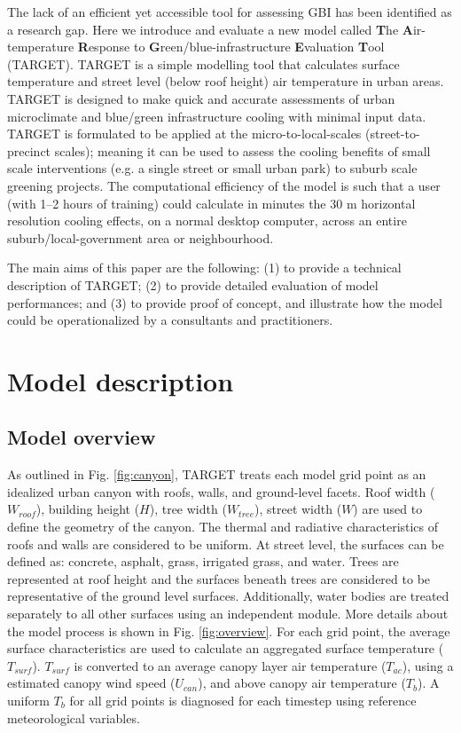 \documentclass[gmd, manuscript]{copernicus}
\begin{document}
The lack of an efficient yet accessible tool for assessing GBI has been identified as a research gap. Here we introduce and evaluate a new model called \textbf{T}he \textbf{A}ir-temperature \textbf{R}esponse to \textbf{G}reen/blue-infrastructure \textbf{E}valuation \textbf{T}ool (TARGET). TARGET is a simple modelling tool that calculates surface temperature and street level (below roof height) air temperature in urban areas. TARGET is designed to make quick and accurate assessments of urban microclimate and blue/green infrastructure cooling with minimal input data. TARGET is formulated to be applied at the micro-to-local-scales (street-to-precinct scales); meaning it can be used to assess the cooling benefits of small scale interventions (e.g. a single street or small urban park) to suburb scale greening projects. The computational efficiency of the model is such that a user (with 1--2 hours of training) could calculate in minutes the 30 m horizontal resolution  cooling effects, on a normal desktop computer, across an entire suburb/local-government area or neighbourhood. 

The main aims of this paper are the following: (1) to provide a technical description of TARGET; (2) to provide detailed evaluation of model performances; and (3) to provide proof of concept, and illustrate how the model could be operationalized  by a consultants and practitioners.



\section{Model description}\label{sec:ModelOverview}
\subsection{Model overview}

As outlined in Fig. \ref{fig:canyon}, TARGET treats each model grid point as an idealized urban canyon with roofs, walls, and  ground-level facets.   Roof width ($W_{roof}$), building  height ($H$), tree width ($W_{tree}$),  street width ($W$)  are used to define the geometry of the canyon. The thermal and radiative characteristics of roofs and walls are considered to be uniform. At street level, the surfaces  can be defined as: concrete, asphalt, grass, irrigated grass, and water. Trees are represented at roof height and the surfaces beneath trees are considered to be representative of the ground level surfaces. Additionally, water bodies are treated separately to all other surfaces using an independent  module. More details about the model process is shown in Fig. \ref{fig:overview}. For each grid point, the average surface characteristics are used to calculate an aggregated surface temperature ($T_{surf}$). $T_{surf}$ is converted to an average canopy layer air temperature ($T_{ac}$), using a estimated canopy wind speed ($U_{can}$), and above canopy air temperature (\ensuremath{T_{b}}).  A uniform \ensuremath{T_{b}} for all grid points is diagnosed for each timestep using reference meteorological variables. 
\end{document}
